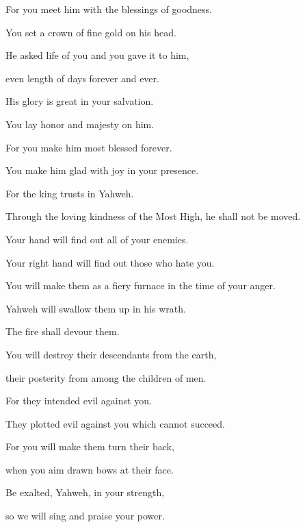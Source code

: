 {\Q {}For you meet him with the blessings of goodness.
\par }{\QB You set a crown of fine gold on his head.
\par }{\Q {}He asked life of you and you gave it to him,
\par }{\QB even length of days forever and ever.
\par }{\Q {}His glory is great in your salvation.
\par }{\QB You lay honor and majesty on him.
\par }{\Q {}For you make him most blessed forever.
\par }{\QB You make him glad with joy in your presence.
\par }{\Q {}For the king trusts in Yahweh.
\par }{\QB Through the loving kindness of the Most High, he shall not be moved.
\par }{\Q {}Your hand will find out all of your enemies.
\par }{\QB Your right hand will find out those who hate you.
\par }{\Q {}You will make them as a fiery furnace in the time of your anger.
\par }{\QB Yahweh will swallow them up in his wrath.
\par }{\QB The fire shall devour them.
\par }{\Q {}You will destroy their descendants from the earth,
\par }{\QB their posterity from among the children of men.
\par }{\Q {}For they intended evil against you.
\par }{\QB They plotted evil against you which cannot succeed.
\par }{\Q {}For you will make them turn their back,
\par }{\QB when you aim drawn bows at their face.
\par }{\Q {}Be exalted, Yahweh, in your strength,
\par }{\QB so we will sing and praise your power.

}

